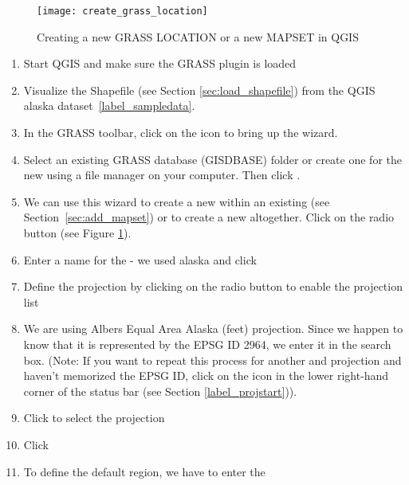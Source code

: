 \begin{figure}[ht]
\begin{center}
\caption{Creating a new GRASS LOCATION or a new MAPSET in QGIS \nixcaption}
\label{fig:create_grass_location}\smallskip
\texttt{[image: create\_grass\_location]}
\end{center}  
\end{figure}

\begin{enumerate}
  \item Start QGIS and make sure the GRASS plugin is loaded
  \item Visualize the  Shapefile (see Section
  \ref{sec:load_shapefile}) from the QGIS alaska dataset~\ref{label_sampledata}.
  \item In the GRASS toolbar, click on the  icon to bring up the  wizard.
  \item Select an existing GRASS database (GISDBASE) folder 
   or create one for the new  using a 
  file manager on your computer. Then click . 
  \item We can use this wizard to create a new  within an 
  existing  (see Section~\ref{sec:add_mapset}) or to create 
  a new  altogether. Click on the radio button
   (see Figure \ref{fig:create_grass_location}).
  \item Enter a name for the  - we used alaska and click 
  \item Define the projection by clicking on the radio button
   to enable the projection list 
  \item We are using Albers Equal Area Alaska (feet) projection. Since we
  happen to know that it is represented by the EPSG ID 2964, we enter it in
  the search box. (Note: If you want to repeat this process for another 
   and projection and haven't memorized the EPSG ID, 
  click on the
   icon in the lower right-hand
  corner of the status bar (see Section \ref{label_projstart})).
  \item Click  to select the projection
  \item Click  
  \item To define the default region, we have to enter the  

\end{enumerate}
